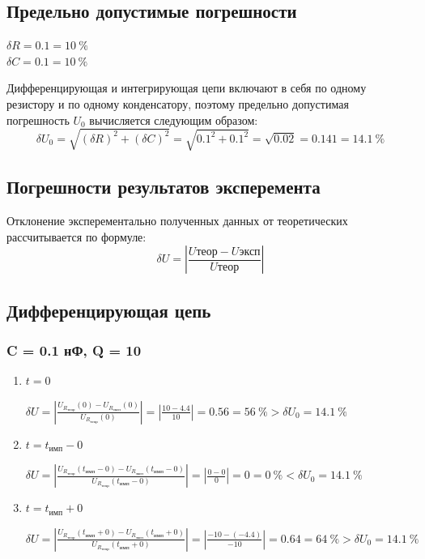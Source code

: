 \subsection{Предельно допустимые погрешности}

\begin{center}
	$\delta R = 0.1 = 10~\%$\\
	$\delta C = 0.1 = 10~\%$\\
\end{center}

Дифференцирующая и интегрирующая цепи включают в себя по одному резистору и по одному конденсатору, поэтому предельно допустимая погрешность $U_0$ вычисляется следующим образом:
\[
\delta U_0 = \sqrt{(\delta R)^2 + (\delta C)^2} = \sqrt{0.1^2 + 0.1^2} = \sqrt{0.02} = 0.141 = 14.1~\%
\]

\subsection{Погрешности результатов эксперемента}

Отклонение эксперементально полученных данных от теоретических рассчитывается по формуле:
\[
\delta U = \left|\frac{U\text{теор}-U\text{эксп}}{U\text{теор}}\right|
\]

\subsection{Дифференцирующая цепь}

\subsubsection{C = 0.1 нФ, Q = 10}

\begin{enumerate}
\item $t = 0$

	$\delta U = \left| \frac{U_{R_\text{теор}}(0) - U_{R_\text{эксп}}(0)}{U_{R_\text{теор}}(0)} \right| = \left| \frac{10 - 4.4}{10} \right| = 0.56 = 56~\% > \delta U_0 = 14.1~\%$

\item $t = t_\text{имп}-0$

	$\delta U = \left| \frac{U_{R_\text{теор}}(t_\text{имп}-0) - U_{R_\text{эксп}}(t_\text{имп}-0)}{U_{R_\text{теор}}(t_\text{имп}-0)} \right| = \left| \frac{0 - 0}{0} \right| = 0 = 0~\% < \delta U_0 = 14.1~\%$

\item  $t = t_\text{имп}+0$

	$\delta U = \left| \frac{U_{R_\text{теор}}(t_\text{имп}+0) - U_{R_\text{эксп}}(t_\text{имп}+0)}{U_{R_\text{теор}}(t_\text{имп}+0)} \right| = \left| \frac{-10 - (-4.4)}{-10} \right| = 0.64 = 64~\% > \delta U_0 = 14.1~\%$
\end{enumerate}

